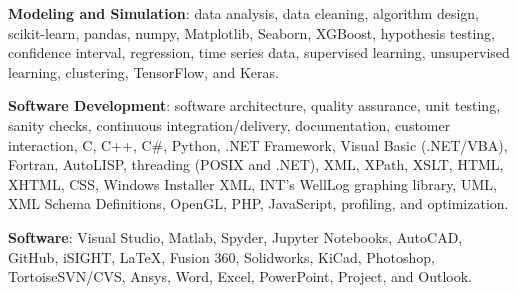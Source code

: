 \documentclass{leresume}
\begin{document}
    \begin{bulletedlist}
		
		\item \textbf{Modeling and Simulation}: data analysis,
                        data cleaning,
                        algorithm design,
                        scikit-learn,
                        pandas,
                        numpy,
                        Matplotlib,
                        Seaborn,
                        XGBoost,
                        hypothesis testing,
                        confidence interval,
                        regression,
                        time series data,
                        supervised learning,
                        unsupervised learning,
                        clustering,
                        TensorFlow,
                        and Keras.
                        
		\item \textbf{Software Development}: software architecture,
                        quality assurance,
                        unit testing,
                        sanity checks,
                        continuous integration/delivery,
                        documentation,
                        customer interaction,
                        C,
                        C++,
                        C\#,
                        Python,
                        .NET Framework,
                        Visual Basic (.NET/VBA),
                        Fortran,
                        AutoLISP,
                        threading (POSIX and .NET),
                        XML,
                        XPath,
                        XSLT,
                        HTML,
                        XHTML,
                        CSS,
                        Windows Installer XML,
                        INT's WellLog graphing library,
                        UML,
                        XML Schema Definitions,
                        OpenGL,
                        PHP,
                        JavaScript,
                        profiling,
                        and optimization.
                        
		\item \textbf{Software}: Visual Studio,
                        Matlab,
                        Spyder,
                        Jupyter Notebooks,
                        AutoCAD,
                        GitHub,
                        iSIGHT,
                        LaTeX,
                        Fusion 360,
                        Solidworks,
                        KiCad,
                        Photoshop,
                        TortoiseSVN/CVS,
                        Ansys,
                        Word,
                        Excel,
                        PowerPoint,
                        Project,
                        and Outlook.
                        

\end{bulletedlist}
\end{document}
